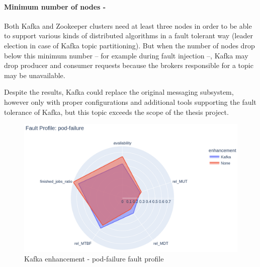 \paragraph{Minimum number of nodes -}Both Kafka and Zookeeper clusters need at least three nodes in order to be able to support various kinds of distributed algorithms in a fault tolerant way (\eg leader election in case of Kafka topic partitioning). But when the number of nodes drop below this minimum number -- for example during fault injection --, Kafka may drop producer and consumer requests because the brokers responsible for a topic may be unavailable.

Despite the results, Kafka could replace the original messaging subsystem, however only with proper configurations and additional tools supporting the fault tolerance of Kafka, but this topic exceeds the scope of the thesis project.

\begin{figure}[H]
	\centering
	\includegraphics[width=140mm, keepaspectratio]{figures/kafka_with_base_pod-failure.png}
	\caption{Kafka enhancement - pod-failure fault profile}
	\label{fig:kafka-results-pod-failure}
\end{figure}


